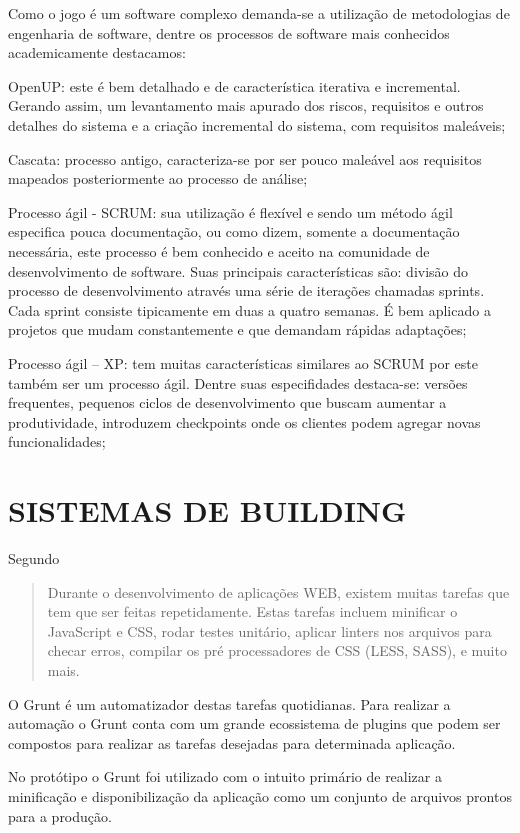 Como o jogo é um software complexo demanda-se a utilização de
metodologias de engenharia de software, dentre os processos de software
mais conhecidos academicamente destacamos:

OpenUP: este é bem detalhado e de característica iterativa e
incremental. Gerando assim, um levantamento mais apurado dos riscos,
requisitos e outros detalhes do sistema e a criação incremental do
sistema, com requisitos maleáveis;

Cascata: processo antigo, caracteriza-se por ser pouco maleável aos
requisitos mapeados posteriormente ao processo de análise;

Processo ágil - SCRUM: sua utilização é flexível e sendo
um método ágil especifica pouca documentação, ou como dizem,
somente a documentação necessária, este processo é bem conhecido e
aceito na comunidade de desenvolvimento de software. Suas principais
características são: divisão do processo de desenvolvimento através
uma série de iterações chamadas sprints. Cada sprint consiste
tipicamente em duas a quatro semanas. É bem aplicado a projetos que
mudam constantemente e que demandam rápidas adaptações;

Processo ágil – XP: tem muitas características similares ao SCRUM
por este também ser um processo ágil. Dentre suas especifidades
destaca-se: versões frequentes, pequenos ciclos de desenvolvimento que
buscam aumentar a produtividade, introduzem checkpoints onde os clientes
podem agregar novas funcionalidades;

\chapter{SISTEMAS DE BUILDING}

Segundo \cite{gruntTutorial}
\begin{quote}
Durante o desenvolvimento de aplicações WEB, existem muitas tarefas
que tem que ser feitas repetidamente. Estas tarefas incluem minificar o
JavaScript e CSS, rodar testes unitário, aplicar linters nos arquivos
para checar erros, compilar os pré processadores de CSS (LESS, SASS), e
muito mais.
\end{quote}

O Grunt é um automatizador destas tarefas quotidianas. Para realizar
a automação o Grunt conta com um grande ecossistema de plugins que
podem ser compostos para realizar as tarefas desejadas para determinada
aplicação.

No protótipo o Grunt foi utilizado com o intuito primário de realizar
a minificação e disponibilização da aplicação como um conjunto de
arquivos prontos para a produção.

